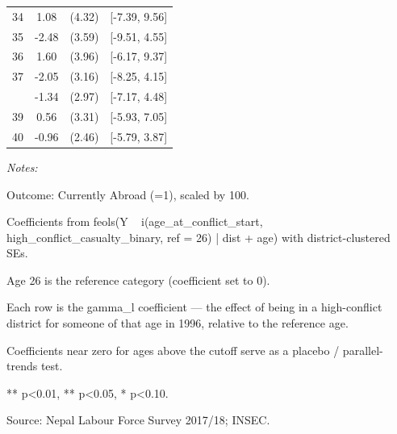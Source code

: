\begin{table}[!h]
\begin{threeparttable}
\begin{tabular}[t]{cccc}
34 & 1.08 & (4.32) & {}[-7.39, 9.56]\\
35 & -2.48 & (3.59) & {}[-9.51, 4.55]\\
36 & 1.60 & (3.96) & {}[-6.17, 9.37]\\
37 & -2.05 & (3.16) & {}[-8.25, 4.15]\\
\addlinespace
38 & -1.34 & (2.97) & {}[-7.17, 4.48]\\
39 & 0.56 & (3.31) & {}[-5.93, 7.05]\\
40 & -0.96 & (2.46) & {}[-5.79, 3.87]\\
\bottomrule
\end{tabular}
\begin{tablenotes}
\item \textit{Notes:} 
\item Outcome: Currently Abroad (=1), scaled by 100.
\item Coefficients from feols(Y ~ i(age_at_conflict_start, high_conflict_casualty_binary, ref = 26) | dist + age) with district-clustered SEs.
\item Age 26 is the reference category (coefficient set to 0).
\item Each row is the gamma_l coefficient — the effect of being in a high-conflict district for someone of that age in 1996, relative to the reference age.
\item Coefficients near zero for ages above the cutoff serve as a placebo / parallel-trends test.
\item *** p<0.01, ** p<0.05, * p<0.10.
\item Source: Nepal Labour Force Survey 2017/18; INSEC.
\end{tablenotes}
\end{threeparttable}
\end{table}
